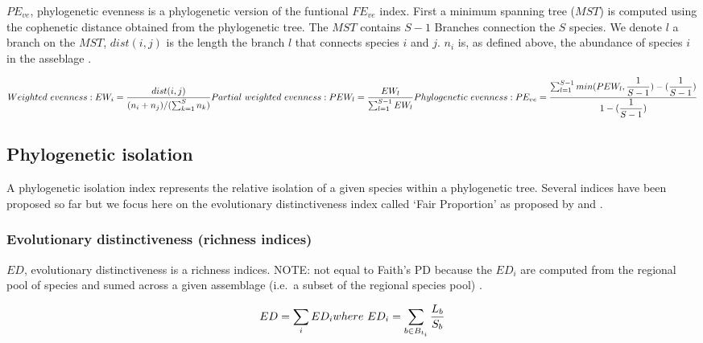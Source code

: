 \documentclass[]{book}
\theoremstyle{definition}
\theoremstyle{definition}
\theoremstyle{remark}
\begin{document}
\(PE_{ve}\), phylogenetic evenness is a phylogenetic version of the
funtional \(FE_{ve}\) index. First a minimum spanning tree (\(MST\)) is
computed using the cophenetic distance obtained from the phylogenetic
tree. The \(MST\) contains \(S-1\) Branches connection the \(S\)
species. We denote \(l\) a branch on the \(MST\), \(dist(i,j)\) is the
length the branch \(l\) that connects species \(i\) and \(j\). \(n_{i}\)
is, as defined above, the abundance of species \(i\) in the asseblage
\citep{Villeger2008, Dehling2014}.

\[
Weighted \ evenness: \\
EW_{i} = \dfrac{dist(i,j)}
{(n_{i} + n_{j})/(\sum_{k=1}^{S}n_{k})} \\
\ \\
Partial \ weighted \ evenness: \\ 
PEW_{l} = \dfrac
{EW_{l}}
{\sum_{l=1}^{S-1} EW_{l}} \\
\ \\
Phylogenetic \ evenness: \\
PE_{ve} = \dfrac
{\sum_{l=1}^{S-1} min(PEW_{l}, \dfrac{1}{S-1}) - (\dfrac{1}{S-1})}
{1- (\dfrac{1}{S-1})}
\]

\hypertarget{phylogenetic-isolation}{\subsection{Phylogenetic
isolation}\label{phylogenetic-isolation}}

A phylogenetic isolation index represents the relative isolation of a
given species within a phylogenetic tree. Several indices have been
proposed so far but we focus here on the evolutionary distinctiveness
index called `Fair Proportion' as proposed by \citet{Redding2003} and
\citet{Isaac2007}.

\subsubsection{Evolutionary distinctiveness (richness
indices)}\label{evolutionary-distinctiveness-richness-indices}

\(ED\), evolutionary distinctiveness is a richness indices. NOTE: not
equal to Faith's PD because the \(ED_{i}\) are computed from the
regional pool of species and sumed across a given assemblage (i.e.~a
subset of the regional species pool)
\citep{Tucker2016, Safi2013a, Redding2003, Isaac2007}.

\[
  ED = \sum_{i}ED_{i} \\
  \ \\ 
  where \ ED_{i} = \sum_{b \in B_{t_{i}}} \dfrac{L_{b}}{S_{b}} 
\]
\end{document}
